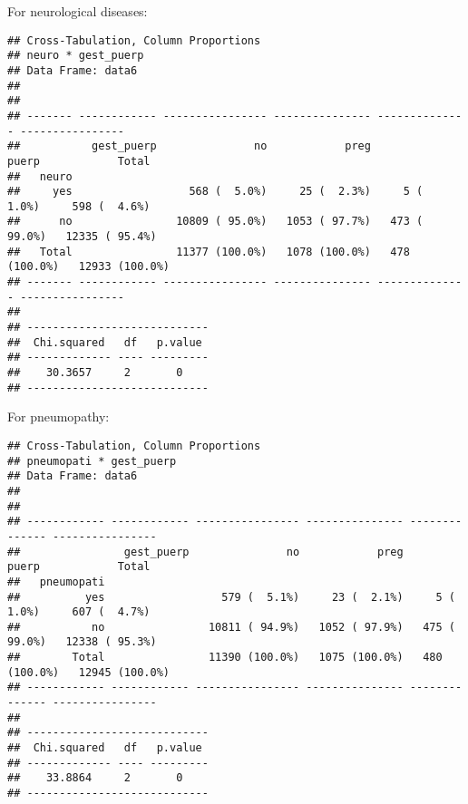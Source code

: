 \documentclass[
]{article}
\newenvironment{Shaded}{\begin{snugshade}}{\end{snugshade}}
\newcommand{\DataTypeTok}[1]{\textcolor[rgb]{0.13,0.29,0.53}{#1}}
\newcommand{\KeywordTok}[1]{\textcolor[rgb]{0.13,0.29,0.53}{\textbf{#1}}}
\newcommand{\NormalTok}[1]{#1}
\newcommand{\OperatorTok}[1]{\textcolor[rgb]{0.81,0.36,0.00}{\textbf{#1}}}
\newcommand{\OtherTok}[1]{\textcolor[rgb]{0.56,0.35,0.01}{#1}}
\newcommand{\StringTok}[1]{\textcolor[rgb]{0.31,0.60,0.02}{#1}}
\begin{document}
For neurological diseases:

\begin{Shaded}
\end{Shaded}

\begin{verbatim}
## Cross-Tabulation, Column Proportions  
## neuro * gest_puerp  
## Data Frame: data6  
## 
## 
## ------- ------------ ---------------- --------------- -------------- ----------------
##           gest_puerp               no            preg          puerp            Total
##   neuro                                                                              
##     yes                  568 (  5.0%)     25 (  2.3%)     5 (  1.0%)     598 (  4.6%)
##      no                10809 ( 95.0%)   1053 ( 97.7%)   473 ( 99.0%)   12335 ( 95.4%)
##   Total                11377 (100.0%)   1078 (100.0%)   478 (100.0%)   12933 (100.0%)
## ------- ------------ ---------------- --------------- -------------- ----------------
## 
## ----------------------------
##  Chi.squared   df   p.value 
## ------------- ---- ---------
##    30.3657     2       0    
## ----------------------------
\end{verbatim}

For pneumopathy:

\begin{Shaded}
\end{Shaded}

\begin{verbatim}
## Cross-Tabulation, Column Proportions  
## pneumopati * gest_puerp  
## Data Frame: data6  
## 
## 
## ------------ ------------ ---------------- --------------- -------------- ----------------
##                gest_puerp               no            preg          puerp            Total
##   pneumopati                                                                              
##          yes                  579 (  5.1%)     23 (  2.1%)     5 (  1.0%)     607 (  4.7%)
##           no                10811 ( 94.9%)   1052 ( 97.9%)   475 ( 99.0%)   12338 ( 95.3%)
##        Total                11390 (100.0%)   1075 (100.0%)   480 (100.0%)   12945 (100.0%)
## ------------ ------------ ---------------- --------------- -------------- ----------------
## 
## ----------------------------
##  Chi.squared   df   p.value 
## ------------- ---- ---------
##    33.8864     2       0    
## ----------------------------
\end{verbatim}
\end{document}
